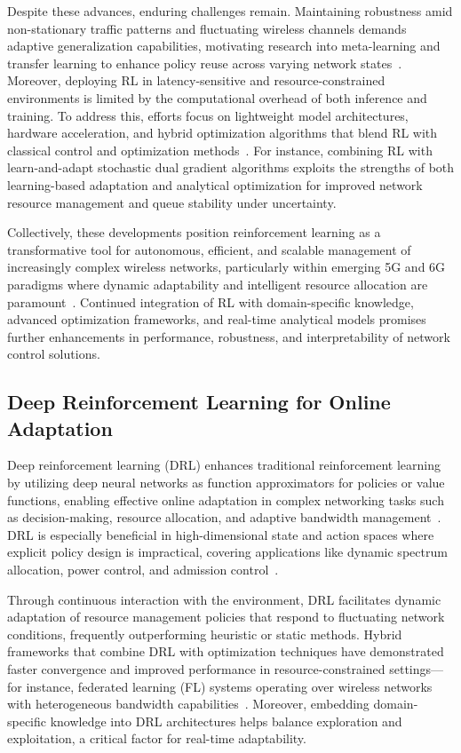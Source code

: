 \documentclass[sigconf]{acmart}
\begin{document}
Despite these advances, enduring challenges remain. Maintaining robustness amid non-stationary traffic patterns and fluctuating wireless channels demands adaptive generalization capabilities, motivating research into meta-learning and transfer learning to enhance policy reuse across varying network states~\cite{ref35}. Moreover, deploying RL in latency-sensitive and resource-constrained environments is limited by the computational overhead of both inference and training. To address this, efforts focus on lightweight model architectures, hardware acceleration, and hybrid optimization algorithms that blend RL with classical control and optimization methods~\cite{ref5,ref33}. For instance, combining RL with learn-and-adapt stochastic dual gradient algorithms exploits the strengths of both learning-based adaptation and analytical optimization for improved network resource management and queue stability under uncertainty.

Collectively, these developments position reinforcement learning as a transformative tool for autonomous, efficient, and scalable management of increasingly complex wireless networks, particularly within emerging 5G and 6G paradigms where dynamic adaptability and intelligent resource allocation are paramount~\cite{ref7,ref50}. Continued integration of RL with domain-specific knowledge, advanced optimization frameworks, and real-time analytical models promises further enhancements in performance, robustness, and interpretability of network control solutions.

\subsection{Deep Reinforcement Learning for Online Adaptation}

Deep reinforcement learning (DRL) enhances traditional reinforcement learning by utilizing deep neural networks as function approximators for policies or value functions, enabling effective online adaptation in complex networking tasks such as decision-making, resource allocation, and adaptive bandwidth management~\cite{ref4,ref8,ref13,ref15,ref50}. DRL is especially beneficial in high-dimensional state and action spaces where explicit policy design is impractical, covering applications like dynamic spectrum allocation, power control, and admission control~\cite{ref4,ref8}.

Through continuous interaction with the environment, DRL facilitates dynamic adaptation of resource management policies that respond to fluctuating network conditions, frequently outperforming heuristic or static methods. Hybrid frameworks that combine DRL with optimization techniques have demonstrated faster convergence and improved performance in resource-constrained settings—for instance, federated learning (FL) systems operating over wireless networks with heterogeneous bandwidth capabilities~\cite{ref50}. Moreover, embedding domain-specific knowledge into DRL architectures helps balance exploration and exploitation, a critical factor for real-time adaptability.
\end{document}
